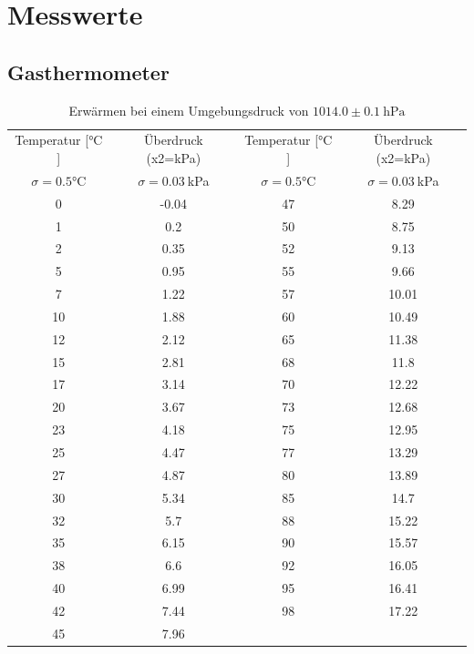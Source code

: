 \documentclass[12pt,a4paper,titlepage,headinclude,bibtotoc]{scrartcl}
\begin{document}
\section{Messwerte}
\subsection{Gasthermometer}
\begin{table}[!htb]
	\centering	
	\begin{tabular}{|c|c||c|c|}
	\hline
	Temperatur [$\si{\celsius}$]  & Überdruck (x2=kPa)&
	Temperatur [$\si{\celsius}$]  & Überdruck (x2=kPa)\\
	$\sigma=0.5\si{\celsius}$ & $\sigma=0.03~$kPa &
	$\sigma=0.5\si{\celsius}$ & $\sigma=0.03~$kPa \\
	\hline
	0	&	-0.04	&	47	&	8.29	\\
	1	&	0.2	&	50	&	8.75	\\
	2	&	0.35	&	52	&	9.13	\\
	5	&	0.95	&	55	&	9.66	\\
	7	&	1.22	&	57	&	10.01	\\
	10	&	1.88	&	60	&	10.49	\\
	12	&	2.12	&	65	&	11.38	\\
	15	&	2.81	&	68	&	11.8	\\
	17	&	3.14	&	70	&	12.22	\\
	20	&	3.67	&	73	&	12.68	\\
	23	&	4.18	&	75	&	12.95	\\
	25	&	4.47	&	77	&	13.29	\\
	27	&	4.87	&	80	&	13.89	\\
	30	&	5.34	&	85	&	14.7	\\
	32	&	5.7	&	88	&	15.22	\\
	35	&	6.15	&	90	&	15.57	\\
	38	&	6.6	&	92	&	16.05	\\
	40	&	6.99	&	95	&	16.41	\\
	42	&	7.44	&	98	&	17.22	\\
	45	&	7.96	&		&		\\
	\hline
	\end{tabular}
	\caption{Erwärmen bei einem Umgebungsdruck von $1014.0\pm 0.1~\si{\hecto\pascal}$}
\end{table}
\end{document}
